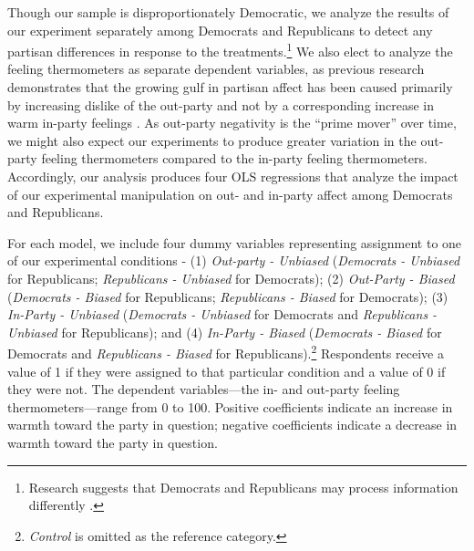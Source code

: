 \documentclass[12pt, letterpaper]{article}
\begin{document}
Though our sample is disproportionately Democratic, we analyze the results of our experiment separately among Democrats and Republicans to detect any partisan differences in response to the treatments.\footnote{Research suggests that Democrats and Republicans may process information differently \citep{grossmanhopkins_2016}.} We also elect to analyze the feeling thermometers as separate dependent variables, as previous research demonstrates that the growing gulf in partisan affect has been caused primarily by increasing dislike of the out-party and not by a corresponding increase in warm in-party feelings \citep{haidthetherington_2012, IyengarSoodLelkes2012}. As out-party negativity is the ``prime mover'' over time, we might also expect our experiments to produce greater variation in the out-party feeling thermometers compared to the in-party feeling thermometers. Accordingly, our analysis produces four OLS regressions that analyze the impact of our experimental manipulation on out- and in-party affect among Democrats and Republicans. 

For each model, we include four dummy variables representing assignment to one of our experimental conditions - (1) \textit{Out-party - Unbiased} (\textit{Democrats - Unbiased} for Republicans; \textit{Republicans - Unbiased} for Democrats); (2) \textit{Out-Party - Biased} (\textit{Democrats - Biased} for Republicans; \textit{Republicans - Biased} for Democrats); (3) \textit{In-Party - Unbiased} (\textit{Democrats - Unbiased} for Democrats and \textit{Republicans - Unbiased} for Republicans); and (4) \textit{In-Party - Biased} (\textit{Democrats - Biased} for Democrats and \textit{Republicans - Biased} for Republicans).\footnote{\textit{Control} is omitted as the reference category.} Respondents receive a value of 1 if they were assigned to that particular condition and a value of 0 if they were not. The dependent variables---the in- and out-party feeling thermometers---range from 0 to 100. Positive coefficients indicate an increase in warmth toward the party in question; negative coefficients indicate a decrease in warmth toward the party in question.
\end{document}
